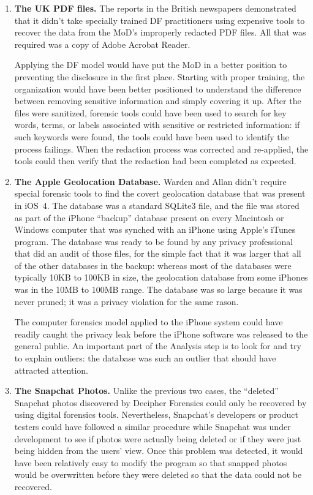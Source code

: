 \begin{enumerate}
\item \textbf{The UK PDF files.} The reports in the British
  newspapers demonstrated  that it didn't take specially trained DF
  practitioners using expensive tools to recover the data from the
  MoD's improperly redacted PDF files. All that was required was a
  copy of Adobe Acrobat Reader. 

  Applying the DF model would have put the MoD in a better position to
  preventing the disclosure in the first place. Starting with proper
  training, the organization would have been better positioned to
  understand the difference between removing sensitive information and
  simply covering it up. After the files were sanitized, forensic tools
  could have been used to search for key words, terms,
  or labels associated with sensitive or restricted information: if
  such keywords were found, the tools could have been used to identify
  the process failings. When the redaction process was corrected and
  re-applied, the tools could then verify that the redaction had been
  completed as expected.

\item \textbf{The Apple Geolocation Database.} Warden and Allan didn't
  require special forensic tools to find the covert geolocation
  database that was present in iOS~4. The database was a standard SQLite3
  file, and the file was stored as part of the iPhone ``backup''
  database present on every Macintosh or Windows computer that was
  synched with an iPhone using Apple's iTunes program. The database
  was ready to be found by any privacy professional that did an audit
  of those files, for the simple fact that it was larger that all of
  the other databases in the backup: whereas most of the databases were typically
  10KB to 100KB in size, the geolocation database from some iPhones was
  in the 10MB to 100MB range. The database was so large because it was
  never pruned; it was a privacy violation for the same rason.

  The computer forensics model applied to the iPhone system could have
  readily caught the privacy leak before the iPhone software was
  released to the general public. An important part of the Analysis
  step is to look for and try to explain outliers: the database
  was such an outlier that should have attracted attention. 

\item \textbf{The Snapchat Photos.} Unlike the previous two cases, the
  ``deleted'' Snapchat photos discovered by Decipher Forensics could
  only be recovered by using digital forensics tools. Nevertheless,
  Snapchat's developers or product
  testers could have followed a similar procedure while Snapchat was
  under development to see if photos were actually being deleted or
  if they were just being hidden from the users' view. Once this
  problem was detected, it would have
  been relatively easy to modify the program so that snapped photos
  would be overwritten before they were deleted so that the data could
  not be recovered.
\end{enumerate}

